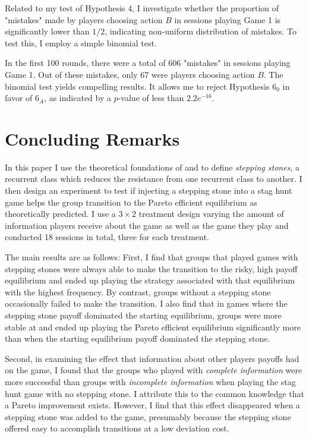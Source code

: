 Related to my test of Hypothesis 4, I investigate whether the proportion of "mistakes" made by players choosing action $B$ in sessions playing Game 1 is significantly lower than $1/2$, indicating non-uniform distribution of mistakes. To test this, I employ a simple binomial test.

In the first 100 rounds, there were a total of 606 "mistakes" in sessions playing Game 1. Out of these mistakes, only 67 were players choosing action $B$. The binomial test yields compelling results. It allows me to reject Hypothesis $6_0$ in favor of $6_A$, as indicated by a $p$-value of less than $2.2e^{-16}$.




\section{Concluding Remarks}

In this paper I use the theoretical foundations of \cite{young1993evolution} and \cite{ellison2000basins} to define \textit{stepping stones}, a recurrent class which reduces the resistance from one recurrent class to another. I then design an experiment to test if injecting a stepping stone into a stag hunt game helps the group transition to the Pareto efficient equilibrium as theoretically predicted. I use a $3 \times 2$ treatment design varying the amount of information players receive about the game as well as the game they play and conducted 18 sessions in total, three for each treatment. 

The main results are as follows: First, I find that groups that played games with stepping stones were always able to make the transition to the risky, high payoff equilibrium and ended up playing the strategy associated with that equilibrium with the highest frequency. By contrast, groups without a stepping stone occasionally failed to make the transition. I also find that in games where the stepping stone payoff dominated the starting equilibrium, groups were more stable at and ended up playing the Pareto efficient equilibrium significantly more than when the starting equilibrium payoff dominated the stepping stone. 

Second, in examining the effect that information about other players\textquotesingle{} payoffs had on the game, I found that the groups who played with \textit{complete information} were more successful than groups with \textit{incomplete information} when playing the stag hunt game with no stepping stone. I attribute this to the common knowledge that a Pareto improvement exists. However, I find that this effect disappeared when a stepping stone was added to the game, presumably because the stepping stone offered easy to accomplish transitions at a low deviation cost. 

